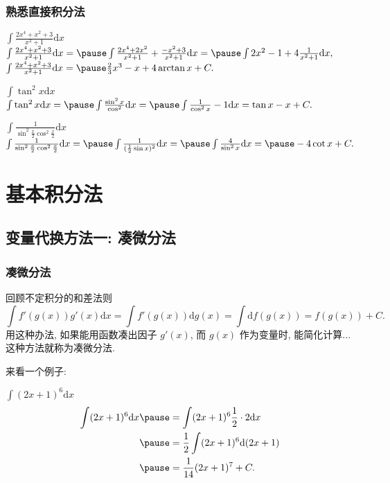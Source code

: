 \documentclass[
10pt,
aspectratio=43,
]{beamer}
\begin{document}
\begin{frame}
	\frametitle{熟悉直接积分法}
	\everymath{\displaystyle}
	{\small
		\begin{exampleblock}{$\int \frac{2 x^4+x^2+3}{x^2+1} \mathrm{d} x$}
			$
				\int \frac{2 x^4+x^2+3}{x^2+1} \mathrm{d} x =\pause \int \frac{2 x^4+2x^2}{x^2+1}+\frac{-x^2+3}{x^2+1} \mathrm{d} x =\pause \int 2x^2-1+4 \frac{1}{x^2+1}\mathrm{d} x,
			$
			\pause
			$
				\int \frac{2 x^4+x^2+3}{x^2+1} \mathrm{d} x = \pause\frac{2}{3}x^3-x+4\arctan x+ C.
			$
		\end{exampleblock}
		\begin{exampleblock}{$\int \tan^2 x \mathrm{d} x$}
			$
				\int \tan^2 x \mathrm{d} x =\pause \int \frac{\sin^2 x}{\cos^2}\mathrm{d} x =\pause \int \frac{1}{\cos^2 x}-1\mathrm{d} x=\tan x-x+C.
			$
		\end{exampleblock}

		\begin{exampleblock}{$\int \frac{1}{\sin ^2 \frac{x}{2} \cos ^2 \frac{x}{2}} \mathrm{d} x$}
			$
				\int \frac{1}{\sin ^2 \frac{x}{2} \cos ^2 \frac{x}{2}} \mathrm{d} x =\pause \int \frac{1}{(\frac{1}{2}\sin x)^2} \mathrm{d} x =\pause \int \frac{4}{\sin^2 x}\mathrm{d} x=\pause-4\cot x+C.
			$
		\end{exampleblock}
	}
\end{frame}

\section{基本积分法}

\subsection{变量代换方法一: 凑微分法}

 
\begin{frame}
	\frametitle{凑微分法}
	\everymath{\displaystyle}
	回顾不定积分的和差法则
	$$
		\int f'(g(x))g'(x)\mathrm{d}x=\int f'(g(x))\mathrm{d}g(x)=\int \mathrm{d}f(g(x))= f(g(x))+C.
	$$
	\pause 
	用这种办法, 如果能用函数凑出因子 $g'(x)$, 而 $g(x)$ 作为变量时, 能简化计算...这种方法就称为凑微分法.
	\vspace{0.3cm}

	来看一个例子:
	\pause 
	\vspace{0.1cm}
	\begin{exampleblock}{$\int(2 x+1)^6 \mathrm{d} x$}
		$$
			\begin{aligned}
				\int(2 x+1)^6 \mathrm{d} x & \pause=  \int(2 x+1)^6 \frac{1}{2}\cdot 2 \mathrm{d} x \\
				                           & \pause=  \frac{1}{2}\int(2 x+1)^6 \mathrm{d} (2x+1)         \\
				                           & \pause= \frac{1}{14}(2x+1)^7+C.
			\end{aligned}
		$$
	\end{exampleblock}

\end{frame}
\end{document}
